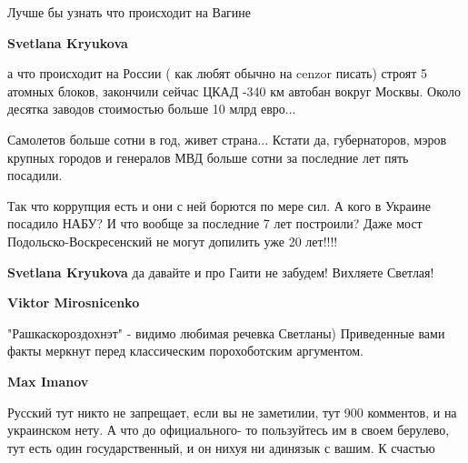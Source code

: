 \begin{itemize}
\begin{itemize}
Лучше бы узнать что происходит на Вагине🐑😂

 
\textbf{Svetlana Kryukova} 

а что происходит на России ( как любят обычно на cenzor писать) строят 5
атомных блоков, закончили сейчас ЦКАД -340 км автобан вокруг Москвы. Около
десятка заводов стоимостью больше 10 млрд евро... 

Самолетов больше сотни в год, живет страна... Кстати да, губернаторов, мэров
крупных городов и генералов МВД больше сотни за последние лет пять посадили. 

Так что коррупция есть и они с ней борются по мере сил. А кого в Украине
посадило НАБУ? И что вообще за последние 7 лет построили? Даже мост
Подольско-Воскресенский не могут допилить уже 20 лет!!!!


 
\textbf{Svetlana Kryukova} да давайте и про Гаити не забудем! Вихляете Светлая!

 
\textbf{Viktor Mirosnicenko} 

"Рашкаскороздохнэт" - видимо любимая речевка Светланы) Приведенные вами факты
меркнут перед классическим порохоботским аргументом.

 
\textbf{Max Imanov} 

Русский тут никто не запрещает, если вы не заметилии, тут 900 комментов, и на
украинском нету. А что до официального- то пользуйтесь им в своем берулево, тут
есть один государственный, и он нихуя ни адинязык с вашим. К счастью



\end{itemize}
\end{itemize}
